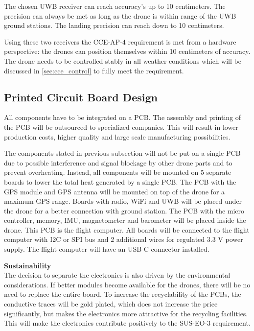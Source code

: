 The chosen UWB receiver can reach accuracy's up to 10 centimeters\cite{UWBrange}. The precision can always be met as long as the drone is within range of the UWB ground stations. The landing precision can reach down to 10 centimeters.

Using these two receivers the CCE-AP-4 requirement is met from a hardware perspective: the drones can position themselves within 10 centimeters of accuracy. The drone needs to be controlled stably in all weather conditions which will be discussed in \autoref{sec:cce_control} to fully meet the requirement.

\subsection{Printed Circuit Board Design}
\label{subsec:cce_pcb}
All components have to be integrated on a PCB. The assembly and printing of the PCB will be outsourced to specialized companies. This will result in lower production costs, higher quality and large scale manufacturing possibilities. 

The components stated in previous subsection will not be put on a single PCB due to possible interference and signal blockage by other drone parts and to prevent overheating. Instead, all components will be mounted on 5 separate boards to lower the total heat generated by a single PCB. The PCB with the GPS module and GPS antenna will be mounted on top of the drone for a maximum GPS range. Boards with radio, WiFi and UWB will be placed under the drone for a better connection with ground station. The PCB with the micro controller, memory, IMU, magnetometer and barometer will be placed inside the drone. This PCB is the flight computer. All boards will be connected to the flight computer with I2C or SPI bus and 2 additional wires for regulated 3.3 V power supply. The flight computer will have an USB-C connector installed.

\textbf{Sustainability}\\
The decision to separate the electronics is also driven by the environmental considerations. If better modules become available for the drones, there will be no need to replace the entire board. To increase the recyclability of the PCBs, the conductive traces will be gold plated, which does not increase the price significantly, but makes the electronics more attractive for the recycling facilities. This will make the electronics contribute positively to the SUS-EO-3 requirement.

